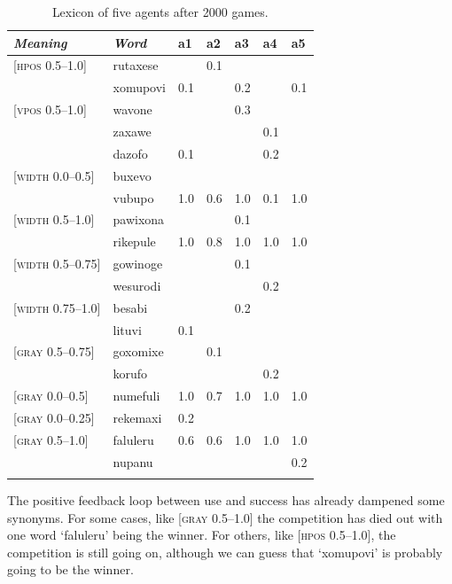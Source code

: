 \begin{table}
\begin{center}
\begin{tabular}{ l  l  l  l  l  l  l  }
\lsptoprule
{\itshape Meaning}&{\itshape Word}&{\bfshape  a1}&{\bfshape  a2}&{\bfshape  a3}&{\bfshape  a4}&{\bfshape  a5} \\ \midrule
{}[\textsc{hpos} 0.5–1.0]&rutaxese& &0.1& & &\\ 
 & xomupovi&0.1& &0.2& &0.1\\ 
{}[\textsc{vpos} 0.5–1.0]&wavone& & &0.3& &\\ 
 & zaxawe& & & &0.1& \\ 
 & dazofo&0.1& & &0.2&\\ 
{}[\textsc{width} 0.0–0.5]&buxevo& & & & & \\ 
 & vubupo&1.0&0.6&1.0&0.1&1.0\\ 
{}[\textsc{width} 0.5–1.0]&pawixona& & &0.1& & \\ 
 & rikepule&1.0&0.8&1.0&1.0&1.0\\ 
{}[\textsc{width} 0.5–0.75]&gowinoge& & &0.1& &  \\ 
 & wesurodi& & & &0.2&\\ 
{}[\textsc{width} 0.75–1.0]&besabi& & &0.2& & \\ 
 & lituvi&0.1& & & & \\ 
{}[\textsc{gray} 0.5–0.75]&goxomixe& &0.1& & & \\ 
 & korufo& & & &0.2&\\ 
{}[\textsc{gray} 0.0–0.5]&numefuli&1.0&0.7&1.0&1.0&1.0\\ 
{}[\textsc{gray} 0.0–0.25]&rekemaxi&0.2& & & & \\ 
{}[\textsc{gray} 0.5–1.0]&faluleru&0.6&0.6&1.0&1.0&1.0\\ 
 & nupanu& & & & &0.2 \\ 
\lspbottomrule
\end{tabular}
\caption{\label{tab:lex2000}Lexicon of five agents after 2000 games.}
\end{center}
\end{table}

The positive feedback loop between use and success
has already dampened some synonyms. For some cases, like [\textsc{gray} 0.5–1.0] the competition has died out 
with one word `faluleru' being the winner. 
For others, like [\textsc{hpos} 0.5–1.0], the competition 
is still going on, although we can guess
that `xomupovi' is probably going to be the winner. 

